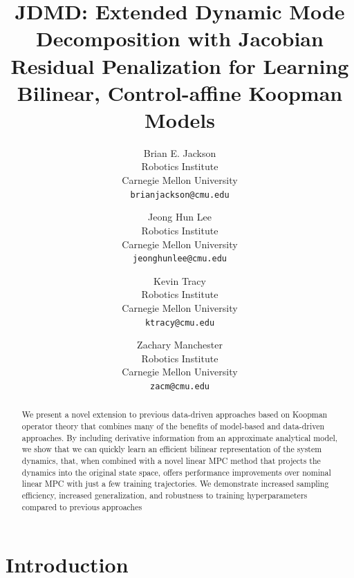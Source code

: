 \documentclass{article}
\title{JDMD: Extended Dynamic Mode Decomposition with Jacobian Residual Penalization
for Learning Bilinear, Control-affine Koopman Models}
\author{
Brian E. Jackson \\
Robotics Institute \\
Carnegie Mellon University \\
\texttt{brianjackson@cmu.edu} \\
\and
Jeong Hun Lee \\
Robotics Institute \\
Carnegie Mellon University \\
\texttt{jeonghunlee@cmu.edu} \\
\and
Kevin Tracy \\
Robotics Institute \\
Carnegie Mellon University \\
\texttt{ktracy@cmu.edu} \\
\and
Zachary Manchester \\
Robotics Institute \\
Carnegie Mellon University \\
\texttt{zacm@cmu.edu} \\
}
\begin{document}
\maketitle

\begin{abstract}
  We present a novel extension to previous data-driven approaches based on Koopman
  operator theory that combines many of the benefits of model-based and data-driven
  approaches.  By including derivative information from an approximate analytical model, we
  show that we can quickly learn an efficient bilinear representation of the system
  dynamics, that, when combined with a novel linear MPC method that projects the dynamics
  into the original state space, offers performance improvements over nominal linear MPC
  with just a few training trajectories. We demonstrate increased sampling efficiency,
  increased generalization, and robustness to training hyperparameters compared to previous
  approaches
\end{abstract}

\section{Introduction}
\end{document}
